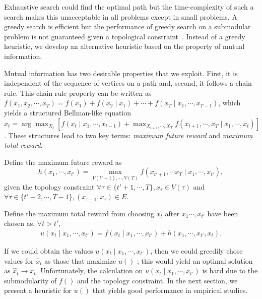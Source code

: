Exhaustive search could find the optimal path but the time-complexity of such a search makes this unacceptable in all problems except in small problems.
A greedy search is efficient but the performance of greedy search on a submodular problem is not guaranteed given a topological constraint~\cite{krause2012submodular}.
Instead of a greedy heuristic, we develop an alternative heuristic based on the property of mutual information.

Mutual information has two desirable properties that we exploit.  First, it is independent of the sequence of vertices on a path and, second, it follows a chain rule.  This chain rule property can be written as
$ f(x_{1}, x_{2}, \cdots , x_{T}) = f(x_{1}) + f(x_{2} \mid x_{1}) + 
\cdots + f(x_{T} \mid x_{1}, \cdots , x_{T-1}) $,
which yields a structured Bellman-like equation  
$ \hat{x}_{t} = \arg \max_{X_{t}} [ f(x_{t} \mid x_{1} , \cdots , x_{t-1}) + \max_{X_{t+1}, \cdots , X_{T}} f(x_{t+1}, \cdots , x_{T} \mid x_{1}, \cdots , x_{t}) ] $.
These structures lead to two key terms: \emph{maximum future reward} and \emph{maximum total reward}.

\begin{mydef}
\label{def:max_future_reward}
Define the maximum future reward as
\begin{equation}
\nonumber
\label{eq:def_h}
h(x_{1} , \cdots, x_{t'} ) = \max_{V(t'+1), \cdots , V(T)} f(x_{t'+1}, \cdots x_{T} \mid x_{1}, \cdots , x_{t'}),
\end{equation} 
given the topology constraint
$ \forall \tau \in \{ t'+1 , \cdots , T \},  x_{\tau} \in V(\tau) $
and
$ \forall \tau \in \{ t'+2, \cdots ,T-1 \}, ( x_{\tau-1}, x_{\tau} ) \in E $.
\end{mydef}

\begin{mydef}
\label{def:max_total_reward}
Define the maximum total reward from choosing $ x_{t} $ after $ x_{1} \cdots , x_{t'} $ have been chosen as, $ \forall t > t' $,
\begin{equation}
\nonumber
\label{eq:def_p_0}
\begin{aligned}
u(x_{t} \mid x_{1} , \cdots , x_{t'} ) = f(x_{t} \mid x_{1} , \cdots , x_{t'}) +  h( x_{1}, \cdots , x_{t'}, x_{t} ).
\end{aligned}
\end{equation}
\end{mydef}

If we could obtain the values $ u(x_{t} \mid x_{1} , \cdots , x_{t'} ) $, then we could greedily chose values for $\hat{x}_t$ as those that maximize $u()$ ; this would yield an optimal solution as $\hat{x}_t \to x_t $.  Unfortunately, the calculation on $ u(x_{t} \mid x_{1} , \cdots , x_{t'} ) $ is hard due to the submodularity of $f()$ and the topology constraint.
In the next section, we present a heuristic for $u()$ that yields good performance in empirical studies.
